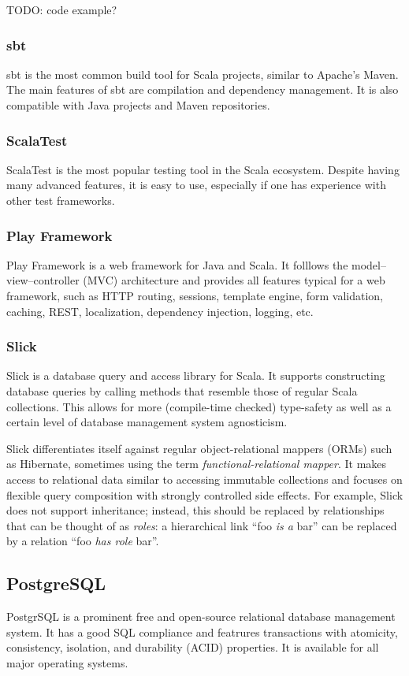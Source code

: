 TODO: code example?

\subsubsection{sbt}
sbt is the most common build tool for Scala projects, similar to Apache's Maven.
The main features of sbt are compilation and dependency management.
It is also compatible with Java projects and Maven repositories.

\subsubsection{ScalaTest}
ScalaTest is the most popular testing tool in the Scala ecosystem.
Despite having many advanced features, it is easy to use, especially if one has experience with other test frameworks.

\subsubsection{Play Framework}
Play Framework is a web framework for Java and Scala.
It folllows the model--view--controller (MVC) architecture and provides all features typical for a web framework, such as  HTTP routing, sessions, template engine, form validation, caching, REST, localization, dependency injection, logging, etc.


\subsubsection{Slick}
Slick is a database query and access library for Scala.
It supports constructing database queries by calling methods that resemble those of regular Scala collections.
This allows for more (compile-time checked) type-safety as well as a certain level of database management system agnosticism.

Slick differentiates itself against regular object-relational mappers (ORMs) such as Hibernate, sometimes using the term \textit{functional-relational mapper}.
It makes access to relational data similar to accessing immutable collections and focuses on flexible query composition with strongly controlled side effects.
For example, Slick does not support inheritance; instead, this should be replaced by relationships that can be thought of as \textit{roles}: a hierarchical link \enquote{foo \textit{is a} bar} can be replaced by a relation \enquote{foo \textit{has role} bar}.

\subsection{PostgreSQL}
PostgrSQL is a prominent free and open-source relational database management system.
It has a good SQL compliance and featrures transactions with atomicity, consistency, isolation, and durability (ACID) properties.
It is available for all major operating systems.

